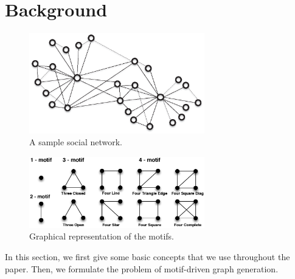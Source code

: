 \section{Background}
\label{sec:background}

\begin{figure}[t]
\centering
\includegraphics[width=3in]{Figures/network.eps}
\caption{A sample social network.}
\label{fig:network}
\end{figure}

\begin{figure}[t]
\centering
\includegraphics[width=3in]{Figures/motifs1.eps}
\caption{Graphical representation of the motifs.}
\label{fig:motif}
\end{figure}

In this section, we first give some basic concepts that we use throughout the paper. Then, we formulate the problem of motif-driven graph generation. 

%
%

